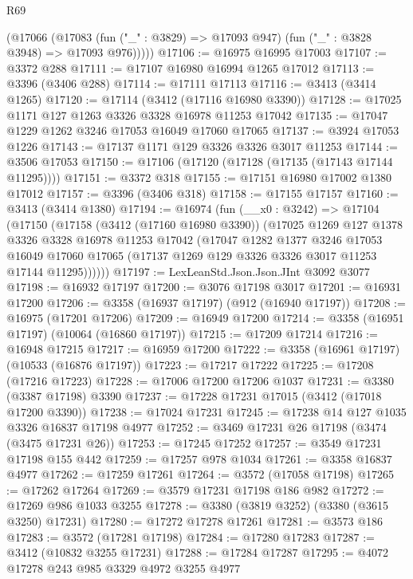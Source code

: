 \begin{lexlean}{R69}
\begin{coremodule}
        (@17066
          (@17083 (fun ("_" : @3829) => @17093 @947) (fun ("_" : @3828 @3948) => @17093 @976)))))
@17106 := @16975 @16995 @17003
@17107 := @3372 @288
@17111 := @17107 @16980 @16994 @1265 @17012
@17113 := @3396 (@3406 @288)
@17114 := @17111 @17113
@17116 := @3413 (@3414 @1265)
@17120 := @17114 (@3412 (@17116 @16980 @3390))
@17128 := @17025 @1171 @127 @1263 @3326 @3328 @16978 @11253 @17042
@17135 := @17047 @1229 @1262 @3246 @17053 @16049 @17060 @17065
@17137 := @3924 @17053 @1226
@17143 := @17137 @1171 @129 @3326 @3326 @3017 @11253
@17144 := @3506 @17053
@17150 := @17106 (@17120 (@17128 (@17135 (@17143 @17144 @11295))))
@17151 := @3372 @318
@17155 := @17151 @16980 @17002 @1380 @17012
@17157 := @3396 (@3406 @318)
@17158 := @17155 @17157
@17160 := @3413 (@3414 @1380)
@17194 := @16974
    (fun (__x0 : @3242) =>
    @17104
      (@17150
        (@17158
          (@3412 (@17160 @16980 @3390))
          (@17025
            @1269
            @127
            @1378
            @3326
            @3328
            @16978
            @11253
            @17042
            (@17047
              @1282
              @1377
              @3246
              @17053
              @16049
              @17060
              @17065
              (@17137 @1269 @129 @3326 @3326 @3017 @11253 @17144 @11295))))))
@17197 := LexLeanStd.Json.Json.JInt @3092 @3077
@17198 := @16932 @17197
@17200 := @3076 @17198 @3017
@17201 := @16931 @17200
@17206 := @3358 (@16937 @17197) (@912 (@16940 @17197))
@17208 := @16975 (@17201 @17206)
@17209 := @16949 @17200
@17214 := @3358 (@16951 @17197) (@10064 (@16860 @17197))
@17215 := @17209 @17214
@17216 := @16948 @17215
@17217 := @16959 @17200
@17222 := @3358 (@16961 @17197) (@10533 (@16876 @17197))
@17223 := @17217 @17222
@17225 := @17208 (@17216 @17223)
@17228 := @17006 @17200 @17206 @1037
@17231 := @3380 (@3387 @17198) @3390
@17237 := @17228 @17231 @17015 (@3412 (@17018 @17200 @3390))
@17238 := @17024 @17231
@17245 := @17238 @14 @127 @1035 @3326 @16837 @17198 @4977
@17252 := @3469 @17231 @26 @17198 (@3474 (@3475 @17231 @26))
@17253 := @17245 @17252
@17257 := @3549 @17231 @17198 @155 @442
@17259 := @17257 @978 @1034
@17261 := @3358 @16837 @4977
@17262 := @17259 @17261
@17264 := @3572 (@17058 @17198)
@17265 := @17262 @17264
@17269 := @3579 @17231 @17198 @186 @982
@17272 := @17269 @986 @1033 @3255
@17278 := @3380 (@3819 @3252) (@3380 (@3615 @3250) @17231)
@17280 := @17272 @17278 @17261
@17281 := @3573 @186
@17283 := @3572 (@17281 @17198)
@17284 := @17280 @17283
@17287 := @3412 (@10832 @3255 @17231)
@17288 := @17284 @17287
@17295 := @4072 @17278 @243 @985 @3329 @4972 @3255 @4977

\end{coremodule}
\end{lexlean}
